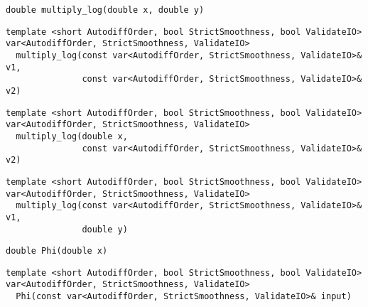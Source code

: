 \begin{tcolorbox}[colback=white,colframe=gray90, coltitle=black,boxrule=3pt,
fonttitle=\bfseries,title= Multiply Log]

\begin{verbatim}
double multiply_log(double x, double y)

\end{verbatim}

\begin{verbatim}
template <short AutodiffOrder, bool StrictSmoothness, bool ValidateIO>
var<AutodiffOrder, StrictSmoothness, ValidateIO>
  multiply_log(const var<AutodiffOrder, StrictSmoothness, ValidateIO>& v1,
               const var<AutodiffOrder, StrictSmoothness, ValidateIO>& v2)

\end{verbatim}

\begin{verbatim}
template <short AutodiffOrder, bool StrictSmoothness, bool ValidateIO>
var<AutodiffOrder, StrictSmoothness, ValidateIO>
  multiply_log(double x,
               const var<AutodiffOrder, StrictSmoothness, ValidateIO>& v2)

\end{verbatim}

\begin{verbatim}
template <short AutodiffOrder, bool StrictSmoothness, bool ValidateIO>
var<AutodiffOrder, StrictSmoothness, ValidateIO>
  multiply_log(const var<AutodiffOrder, StrictSmoothness, ValidateIO>& v1,
               double y)

\end{verbatim}

\end{tcolorbox}

\begin{tcolorbox}[colback=white,colframe=gray90, coltitle=black,boxrule=3pt,
fonttitle=\bfseries,title= Phi]

\begin{verbatim}
double Phi(double x)

\end{verbatim}

\begin{verbatim}
template <short AutodiffOrder, bool StrictSmoothness, bool ValidateIO>
var<AutodiffOrder, StrictSmoothness, ValidateIO>
  Phi(const var<AutodiffOrder, StrictSmoothness, ValidateIO>& input)

\end{verbatim}

\end{tcolorbox}

